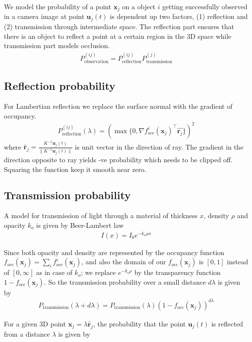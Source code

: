 \documentclass[10pt,twocolumn,letterpaper]{article}
\newcommand{\trackpj}[1]{\mathbf{u}_j(#1)}
\newcommand{\occf}{f^i_{occ}(\mathbf{x}_j)}
\newcommand{\occftot}{f_{occ}(\mathbf{x}_j)}
\newcommand{\ray}{\hat{\mathbf{r}}_j}
\newcommand{\Prefl}{P^{(ij)}_{\text{reflection}}(\lambda)}
\begin{document}
We model the probability of a point $\mathbf{x}_j$ on a object $i$ getting successfully
observed in a camera image at point $\trackpj{t}$ is dependent up two factors,
(1) reflection and (2) transmission through intermediate space. The reflection
part ensures that there is an object to reflect a point at a certain region in
the 3D space while transmission part models occlusion.
\begin{align}
  P^{(ij)}_{\text{observation}} = P^{(ij)}_{\text{reflection}}P^{(j)}_{\text{transmission}}
\end{align}

\subsection{Reflection probability}
For Lambertian reflection we replace the surface normal with the
gradient of occupancy.
%
\begin{align}
  \Prefl = (\max \{0, \nabla \occf^\top
  \hat{\mathbf{r}_j}\})^2
\end{align}
%
where $\ray =
\frac{K^{-1}\trackpj{t}}{\|K^{-1}\trackpj{t}\|}$ is unit vector in the
direction of ray. The gradient in the direction opposite to ray yields -ve
probability which needs to be clipped off. Squaring the function keep it
smooth near zero.

\subsection{Transmission probability}
A model for transmission of light through a material of thickness $x$,
density $\rho$ and opacity $k_o$ is given by Beer-Lambert law 
%
\begin{align}
  I(x) = I_0e^{-k_o\rho x}
\end{align}
%

Since both opacity and density are represented by the occupancy function
$\occftot = \sum_i \occf$, and also the domain of our $\occftot$ is $[0, 1]$ instead of $[0,
\infty]$ as in case of $k_o$; we replace $e^{-k_o\rho}$ by the transparency
function $1 - \occftot$. So the transmission probability over a small distance
$d\lambda$ is given by
%
\begin{align}
  P_{\text{transmission}}(\lambda + d\lambda) =
  P_{\text{transmission}}(\lambda) (1-\occftot)^{d\lambda}
\end{align}
%

For a given 3D point $\mathbf{x}_j = \lambda \ray$, the probability that the
point $\trackpj{t}$ is reflected from a distance $\lambda$ is given by
\end{document}
